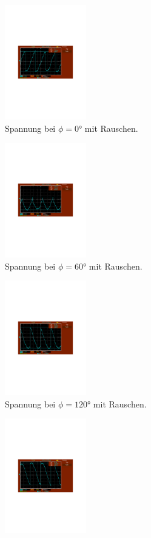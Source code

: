 \begin{figure}
  \label{fig:mit}
  \begin{subfigure}{0.48\textwidth}
      \centering
      \includegraphics[height=5cm]{content/abbildungen/mit/0.pdf}
      \caption{Spannung bei $\phi = 0°$ mit Rauschen.}
  \end{subfigure}
\hfill 
  \begin{subfigure}{0.48\textwidth}
      \centering
      \includegraphics[height=5cm]{content/abbildungen/mit/60.pdf}
      \caption{Spannung bei $\phi = 60°$ mit Rauschen.}
  \end{subfigure}
\hfill 
  \begin{subfigure}{0.48\textwidth}
      \centering
      \includegraphics[height=5cm]{content/abbildungen/mit/120.pdf}
      \caption{Spannung bei $\phi = 120°$ mit Rauschen.}
  \end{subfigure}
\hfill 
  \begin{subfigure}{0.48\textwidth}
      \centering
      \includegraphics[height=5cm]{content/abbildungen/mit/180.pdf}

\end{subfigure}
\end{figure}
